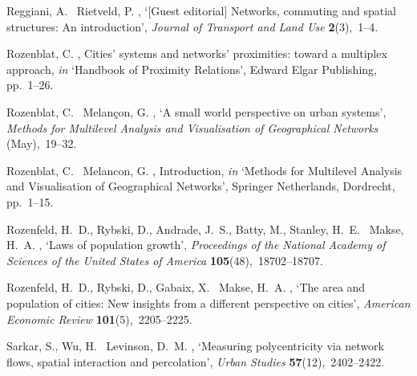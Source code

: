 \documentclass[11pt, a4paper]{article}
\begin{document}
\begin{thebibliography}{xx}
Reggiani, A. \harvardand\ Rietveld, P.  \harvardyearright
  , `{[Guest editorial] Networks, commuting and spatial structures: An
  introduction}', {\em Journal of Transport and Land Use} {\bf 2}(3),~1--4.

Rozenblat, C.  \harvardyearright , {Cities' systems and
  networks' proximities: toward a multiplex approach}, {\em in} `Handbook of
  Proximity Relations', Edward Elgar Publishing, pp.~1--26.
\newline{}

Rozenblat, C. \harvardand\ Melan{\c{c}}on, G.  \harvardyearright , `{A small world perspective on urban systems}', {\em
  Methods for Multilevel Analysis and Visualisation of Geographical Networks}
  (May),~19--32.

Rozenblat, C. \harvardand\ Melancon, G.  \harvardyearright , {Introduction}, {\em in} `Methods for Multilevel
  Analysis and Visualisation of Geographical Networks', Springer Netherlands,
  Dordrecht, pp.~1--15.
\newline{}

Rozenfeld, H.~D., Rybski, D., Andrade, J.~S., Batty, M., Stanley, H.~E.
  \harvardand\ Makse, H.~A.  \harvardyearright , `{Laws of
  population growth}', {\em Proceedings of the National Academy of Sciences of
  the United States of America} {\bf 105}(48),~18702--18707.

Rozenfeld, H.~D., Rybski, D., Gabaix, X. \harvardand\ Makse, H.~A.
  \harvardyearleft 2011\harvardyearright , `{The area and population of cities:
  New insights from a different perspective on cities}', {\em American Economic
  Review} {\bf 101}(5),~2205--2225.

Sarkar, S., Wu, H. \harvardand\ Levinson, D.~M.  \harvardyearleft
  2020\harvardyearright , `{Measuring polycentricity via network flows, spatial
  interaction and percolation}', {\em Urban Studies} {\bf 57}(12),~2402--2422.


\end{thebibliography}
\end{document}
